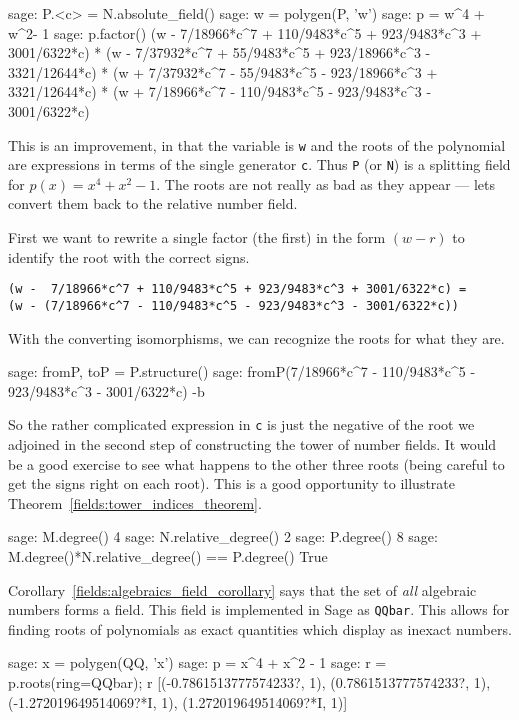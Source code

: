 %
\begin{sageexample}
sage: P.<c> = N.absolute_field()
sage: w = polygen(P, 'w')
sage: p = w^4 + w^2- 1
sage: p.factor()
(w - 7/18966*c^7 + 110/9483*c^5 +  923/9483*c^3 +  3001/6322*c) *
(w - 7/37932*c^7 +  55/9483*c^5 + 923/18966*c^3 - 3321/12644*c) *
(w + 7/37932*c^7 -  55/9483*c^5 - 923/18966*c^3 + 3321/12644*c) *
(w + 7/18966*c^7 - 110/9483*c^5 -  923/9483*c^3 -  3001/6322*c)
\end{sageexample}
%
This is an improvement, in that the variable is \verb?w? and the roots of the polynomial are expressions in terms of the single generator \verb?c?.  Thus \verb?P? (or \verb?N?) is a splitting field for $p(x)=x^4+x^2-1$.  The roots are not really as bad as they appear --- lets convert them back to the relative number field.\par
%
First we want to rewrite a single factor (the first) in the form $(w-r)$ to identify the root with the correct signs.\par\noindent
\verb?(w -  7/18966*c^7 + 110/9483*c^5 + 923/9483*c^3 + 3001/6322*c) =?\\
\verb?(w - (7/18966*c^7 - 110/9483*c^5 - 923/9483*c^3 - 3001/6322*c))?\par
%
With the converting isomorphisms, we can recognize the roots for what they are.
%
\begin{sageexample}
sage: fromP, toP = P.structure()
sage: fromP(7/18966*c^7 - 110/9483*c^5 - 923/9483*c^3 - 3001/6322*c)
-b
\end{sageexample}
%
So the rather complicated expression in \verb?c? is just the negative of the root we adjoined in the second step of constructing the tower of number fields.  It would be a good exercise to see what happens to the other three roots (being careful to get the signs right on each root).  This is a good opportunity to illustrate Theorem~\ref{fields:tower_indices_theorem}.
%
\begin{sageexample}
sage: M.degree()
4
sage: N.relative_degree()
2
sage: P.degree()
8
sage: M.degree()*N.relative_degree() == P.degree()
True
\end{sageexample}
%
%
Corollary~\ref{fields:algebraics_field_corollary} says that the set of \emph{all} algebraic numbers forms a field.  This field is implemented in Sage as \verb?QQbar?.  This allows for finding roots of polynomials as exact quantities which display as inexact numbers.
%
\begin{sageexample}
sage: x = polygen(QQ, 'x')
sage: p = x^4 + x^2 - 1
sage: r = p.roots(ring=QQbar); r
[(-0.7861513777574233?,  1), (0.7861513777574233?,  1),
 (-1.272019649514069?*I, 1), (1.272019649514069?*I, 1)]
\end{sageexample}
